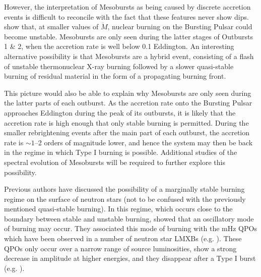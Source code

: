 \par However, the interpretation of Mesobursts as being caused by discrete accretion events is difficult to reconcile with the fact that these features never show dips.  \citet{Bildsten_Nuclear} show that, at smaller values of $\dot{M}$, nuclear burning on the Bursting Pulsar could become unstable.  Mesobursts are only seen during the latter stages of Outbursts 1 \& 2, when the accretion rate is well below 0.1 Eddington.  An interesting alternative possibility is that Mesobursts are a hybrid event, consisting of a flash of unstable thermonuclear X-ray burning followed by a slower quasi-stable burning of residual material in the form of a propagating burning front.
\par This picture would also be able to explain why Mesobursts are only seen during the latter parts of each outburst.  As the accretion rate onto the Bursting Pulsar approaches Eddington during the peak of its outbursts, it is likely that the accretion rate is high enough that only stable burning is permitted.  During the smaller rebrightening events after the main part of each outburst, the accretion rate is $\sim1$--2 orders of magnitude lower, and hence the system may then be back in the regime in which Type I burning is possible.  Additional studies of the spectral evolution of Mesobursts will be required to further explore this possibility.
\par Previous authors have discussed the possibility of a marginally stable burning regime on the surface of neutron stars (not to be confused with the previously mentioned quasi-stable burning).  In this regime, which occurs close to the boundary between stable and unstable burning, \citet{Heger_MargStab} showed that an oscillatory mode of burning may occur.  They associated this mode of burning with the mHz QPOs which have been observed in a number of neutron star LMXBs (e.g. \citealp{Revnivtsev_MargStab,Altamirano_MargStab}).  These QPOs only occur over a narrow range of source luminosities, show a strong decrease in amplitude at higher energies, and they disappear after a Type I burst (e.g. \citealp{Altamirano_MargStab}).
